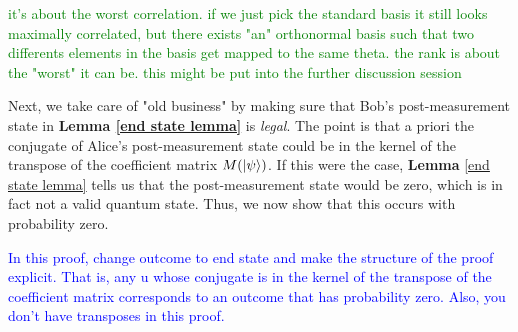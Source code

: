 \begin{example}

\end{example}
\textcolor{green}{it's about the worst correlation. if we just pick the standard basis it still looks maximally correlated, but there exists "an" orthonormal basis such that two differents elements in the basis get mapped to the same theta. the rank is about the "worst" it can be. this might be put into the further discussion session}





Next, we take care of "old business" by making sure that Bob's post-measurement state in \textbf{Lemma \ref{end state lemma}} is {\emph{legal}}.  The point is that a priori the conjugate of Alice's post-measurement state could be in the kernel of the transpose of the coefficient matrix $M(\ket{\psi})$. If this were the case, {\bf{Lemma}} \ref{end state lemma} tells us that the post-measurement state would be zero, which is in fact not a valid quantum state.  Thus, we now show that this occurs with probability zero.

\textcolor{blue}{In this proof, change outcome to end state and make the structure of the proof explicit.  That is, any u whose conjugate is in the kernel of the transpose of the coefficient matrix corresponds to an outcome that has probability zero.  Also, you don't have transposes in this proof.}


